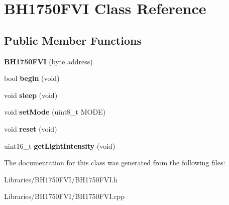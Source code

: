 \hypertarget{class_b_h1750_f_v_i}{}\section{B\+H1750\+F\+V\+I Class Reference}
\label{class_b_h1750_f_v_i}
\subsection*{Public Member Functions}
\begin{DoxyCompactItemize}
\item 
\hypertarget{class_b_h1750_f_v_i_a87363c13729aee32e28c7e710bdcecf3}{}{\bfseries B\+H1750\+F\+V\+I} (byte address)\label{class_b_h1750_f_v_i_a87363c13729aee32e28c7e710bdcecf3}

\item 
\hypertarget{class_b_h1750_f_v_i_a1b18d85ef3ffcd34c63beb2062061f70}{}bool {\bfseries begin} (void)\label{class_b_h1750_f_v_i_a1b18d85ef3ffcd34c63beb2062061f70}

\item 
\hypertarget{class_b_h1750_f_v_i_a4fa874233e7f977a52e7279557ef1245}{}void {\bfseries sleep} (void)\label{class_b_h1750_f_v_i_a4fa874233e7f977a52e7279557ef1245}

\item 
\hypertarget{class_b_h1750_f_v_i_a33d2b3774837fd7375302d154f851efc}{}void {\bfseries set\+Mode} (uint8\+\_\+t M\+O\+D\+E)\label{class_b_h1750_f_v_i_a33d2b3774837fd7375302d154f851efc}

\item 
\hypertarget{class_b_h1750_f_v_i_a3ce11aec23163613f83ac76de9b5872b}{}void {\bfseries reset} (void)\label{class_b_h1750_f_v_i_a3ce11aec23163613f83ac76de9b5872b}

\item 
\hypertarget{class_b_h1750_f_v_i_a7ee84f4b34a92091a37790fea3c72070}{}uint16\+\_\+t {\bfseries get\+Light\+Intensity} (void)\label{class_b_h1750_f_v_i_a7ee84f4b34a92091a37790fea3c72070}

\end{DoxyCompactItemize}


The documentation for this class was generated from the following files\+:\begin{DoxyCompactItemize}
\item 
Libraries/\+B\+H1750\+F\+V\+I/B\+H1750\+F\+V\+I.\+h\item 
Libraries/\+B\+H1750\+F\+V\+I/B\+H1750\+F\+V\+I.\+cpp\end{DoxyCompactItemize}
